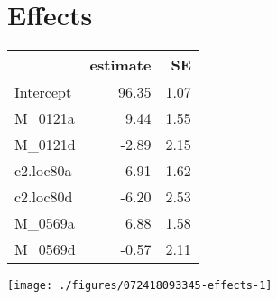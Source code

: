 \documentclass[a4paper,11pt]{article}\usepackage[]{graphicx}\usepackage[]{color}
\makeatletter
\def\maxwidth{ %
  \ifdim\Gin@nat@width>\linewidth
    \linewidth
  \else
    \Gin@nat@width
  \fi
}
\makeatother
\begin{document}
\section{Effects}
\begin{table}[ht]
\begin{flushleft}
\begin{tabular}{lrr}
  \hline
 & estimate & SE \\ 
  \hline
Intercept & 96.35 & 1.07 \\ 
  M\_0121a & 9.44 & 1.55 \\ 
  M\_0121d & -2.89 & 2.15 \\ 
  c2.loc80a & -6.91 & 1.62 \\ 
  c2.loc80d & -6.20 & 2.53 \\ 
  M\_0569a & 6.88 & 1.58 \\ 
  M\_0569d & -0.57 & 2.11 \\ 
   \hline
\end{tabular}
\label{effects}
\end{flushleft}
\end{table}

\texttt{[image: ./figures/072418093345-effects-1]} 

\end{document}
